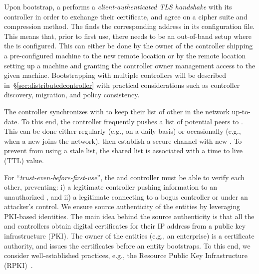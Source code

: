 Upon bootstrap, a \tp performs a \textit{client-authenticated TLS handshake} with its
controller in order to exchange their certificate, and agree on a cipher suite and compression
method. The \tp finds the corresponding address in its configuration file. This means
that, prior to first use, there needs to be an out-of-band setup where the \tp is
configured. This can either be done by the owner of the controller shipping a pre-configured
machine to the new remote location or by the remote location setting up a machine and
granting the controller owner management access to the given machine. Bootstrapping \tps
with multiple controllers will be described in~\S\ref{sec:distributedcontroller} with
practical considerations such as controller discovery, \tp migration, and policy consistency.

The controller synchronizes with \tps to keep their list of other \tps in the network
up-to-date. To this end, the controller frequently pushes a list of potential peers to \tps.
This can be done either regularly (e.g., on a daily basis) or occasionally
(e.g., when a new \tp joins the network).
\tps then establish a secure channel with new \tps. To prevent \tps from using a stale \tp list,
the shared \tp list is associated with a time to live (TTL) value.

For ``\textit{trust-even-before-first-use}'',
the \tps and controller must be able to verify each
other, preventing: i) a legitimate controller pushing information to an unauthorized \tp,
and ii) a legitimate \tp connecting to a bogus controller or \tp under an attacker's control.
We ensure source authenticity of the \name entities by leveraging PKI-based identities.
The main idea behind the source authenticity is that all the \tps and controllers obtain
digital certificates for their IP address from a public key infrastructure (PKI). The owner
of the entities (e.g., an enterprise) is a certificate authority, and issues the certificates
before an entity bootstraps. To this end, we consider well-established practices, e.g.,
the Resource Public Key Infrastructure (RPKI)~\cite{rfc7115,rfc6810}.


